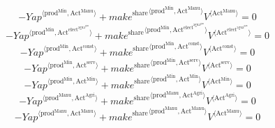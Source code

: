 \begin{equation}
-{{Y\!a\!p}}^{\langle \mathrm{prod}^{\mathrm{Min}},\mathrm{Act}^{\mathrm{Manu}}\rangle} + {{{m\!a\!k\!e}^{\mathrm{share}}}^{\langle \mathrm{\mathrm{prod}^{\mathrm{Min}}},\mathrm{\mathrm{Act}^{\mathrm{Manu}}}\rangle}} {{V}^{\langle \mathrm{Act}^{\mathrm{Manu}}\rangle}} = 0
\end{equation}
\begin{equation}
-{{Y\!a\!p}}^{\langle \mathrm{prod}^{\mathrm{Min}},\mathrm{Act}^{\mathrm{elect}^{\mathrm{agua}^{\mathrm{gas}}}}\rangle} + {{{m\!a\!k\!e}^{\mathrm{share}}}^{\langle \mathrm{\mathrm{prod}^{\mathrm{Min}}},\mathrm{\mathrm{Act}^{\mathrm{elect}^{\mathrm{agua}^{\mathrm{gas}}}}}\rangle}} {{V}^{\langle \mathrm{Act}^{\mathrm{elect}^{\mathrm{agua}^{\mathrm{gas}}}}\rangle}} = 0
\end{equation}
\begin{equation}
-{{Y\!a\!p}}^{\langle \mathrm{prod}^{\mathrm{Min}},\mathrm{Act}^{\mathrm{const}}\rangle} + {{{m\!a\!k\!e}^{\mathrm{share}}}^{\langle \mathrm{\mathrm{prod}^{\mathrm{Min}}},\mathrm{\mathrm{Act}^{\mathrm{const}}}\rangle}} {{V}^{\langle \mathrm{Act}^{\mathrm{const}}\rangle}} = 0
\end{equation}
\begin{equation}
-{{Y\!a\!p}}^{\langle \mathrm{prod}^{\mathrm{Min}},\mathrm{Act}^{\mathrm{serv}}\rangle} + {{{m\!a\!k\!e}^{\mathrm{share}}}^{\langle \mathrm{\mathrm{prod}^{\mathrm{Min}}},\mathrm{\mathrm{Act}^{\mathrm{serv}}}\rangle}} {{V}^{\langle \mathrm{Act}^{\mathrm{serv}}\rangle}} = 0
\end{equation}
\begin{equation}
-{{Y\!a\!p}}^{\langle \mathrm{prod}^{\mathrm{Min}},\mathrm{Act}^{\mathrm{Min}}\rangle} + {{{m\!a\!k\!e}^{\mathrm{share}}}^{\langle \mathrm{\mathrm{prod}^{\mathrm{Min}}},\mathrm{\mathrm{Act}^{\mathrm{Min}}}\rangle}} {{V}^{\langle \mathrm{Act}^{\mathrm{Min}}\rangle}} = 0
\end{equation}
\begin{equation}
-{{Y\!a\!p}}^{\langle \mathrm{prod}^{\mathrm{Manu}},\mathrm{Act}^{\mathrm{Agri}}\rangle} + {{{m\!a\!k\!e}^{\mathrm{share}}}^{\langle \mathrm{\mathrm{prod}^{\mathrm{Manu}}},\mathrm{\mathrm{Act}^{\mathrm{Agri}}}\rangle}} {{V}^{\langle \mathrm{Act}^{\mathrm{Agri}}\rangle}} = 0
\end{equation}
\begin{equation}
-{{Y\!a\!p}}^{\langle \mathrm{prod}^{\mathrm{Manu}},\mathrm{Act}^{\mathrm{Manu}}\rangle} + {{{m\!a\!k\!e}^{\mathrm{share}}}^{\langle \mathrm{\mathrm{prod}^{\mathrm{Manu}}},\mathrm{\mathrm{Act}^{\mathrm{Manu}}}\rangle}} {{V}^{\langle \mathrm{Act}^{\mathrm{Manu}}\rangle}} = 0
\end{equation}
